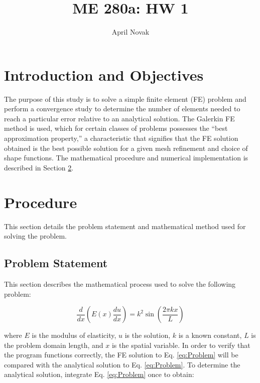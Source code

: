 \documentclass[10pt]{article}
\begin{document}
\title{ME 280a: HW 1}
\author{April Novak}

\maketitle

\section{Introduction and Objectives}

The purpose of this study is to solve a simple finite element (FE) problem and perform a convergence study to determine the number of elements needed to reach a particular error relative to an analytical solution. The Galerkin FE method is used, which for certain classes of problems possesses the ``best approximation property,'' a characteristic that signifies that the FE solution obtained is the best possible solution for a given mesh refinement and choice of shape functions. The mathematical procedure and numerical implementation is described in Section \ref{sec:Procedure}.

\section{Procedure}
\label{sec:Procedure}

This section details the problem statement and mathematical method used for solving the problem.

\subsection{Problem Statement}

This section describes the mathematical process used to solve the following problem:

\begin{equation}
\label{eq:Problem}
\frac{d}{dx}\left(E(x)\frac{du}{dx}\right)=k^2\sin{\left(\frac{2\pi kx}{L}\right)}
\end{equation}

where \(E\) is the modulus of elasticity, \(u\) is the solution, \(k\) is a known constant, \(L\) is the problem domain length, and \(x\) is the spatial variable. In order to verify that the program functions correctly, the FE solution to Eq. \eqref{eq:Problem} will be compared with the analytical solution to Eq. \eqref{eq:Problem}. To determine the analytical solution, integrate Eq. \eqref{eq:Problem} once to obtain:
\end{document}
